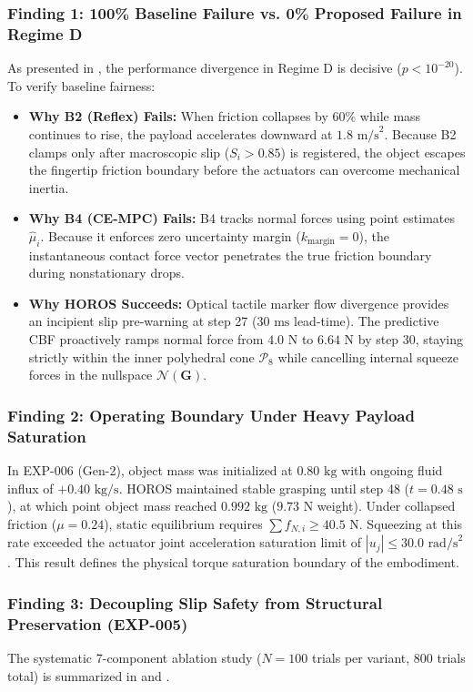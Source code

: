 \subsubsection{Finding 1: 100\% Baseline Failure vs. 0\% Proposed Failure in Regime D}
As presented in , the performance divergence in Regime D is decisive ($p < 10^{-20}$). To verify baseline fairness:
\begin{itemize}
    \item \textbf{Why B2 (Reflex) Fails:} When friction collapses by $60\%$ while mass continues to rise, the payload accelerates downward at $1.8\text{ m/s}^2$. Because B2 clamps only after macroscopic slip ($S_i > 0.85$) is registered, the object escapes the fingertip friction boundary before the actuators can overcome mechanical inertia.
    \item \textbf{Why B4 (CE-MPC) Fails:} B4 tracks normal forces using point estimates $\hat{\mu}_i$. Because it enforces zero uncertainty margin ($k_{\text{margin}} = 0$), the instantaneous contact force vector penetrates the true friction boundary during nonstationary drops.
    \item \textbf{Why HOROS Succeeds:} Optical tactile marker flow divergence provides an incipient slip pre-warning at step 27 ($30\text{ ms}$ lead-time). The predictive CBF proactively ramps normal force from $4.0\text{ N}$ to $6.64\text{ N}$ by step 30, staying strictly within the inner polyhedral cone $\mathcal{P}_8$ while cancelling internal squeeze forces in the nullspace $\mathcal{N}(\mathbf{G})$.
\end{itemize}

\subsubsection{Finding 2: Operating Boundary Under Heavy Payload Saturation}
In EXP-006 (Gen-2), object mass was initialized at $0.80\text{ kg}$ with ongoing fluid influx of $+0.40\text{ kg/s}$. HOROS maintained stable grasping until step 48 ($t = 0.48\text{ s}$), at which point object mass reached $0.992\text{ kg}$ ($9.73\text{ N}$ weight). Under collapsed friction ($\mu = 0.24$), static equilibrium requires $\sum f_{N, i} \ge 40.5\text{ N}$. Squeezing at this rate exceeded the actuator joint acceleration saturation limit of $|u_j| \le 30.0\text{ rad/s}^2$. This result defines the physical torque saturation boundary of the embodiment.

\subsubsection{Finding 3: Decoupling Slip Safety from Structural Preservation (EXP-005)}
The systematic 7-component ablation study ($N = 100$ trials per variant, 800 trials total) is summarized in  and .

